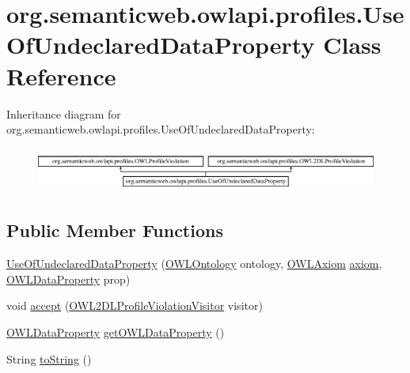 \hypertarget{classorg_1_1semanticweb_1_1owlapi_1_1profiles_1_1_use_of_undeclared_data_property}{\section{org.\-semanticweb.\-owlapi.\-profiles.\-Use\-Of\-Undeclared\-Data\-Property Class Reference}
\label{classorg_1_1semanticweb_1_1owlapi_1_1profiles_1_1_use_of_undeclared_data_property}
}
Inheritance diagram for org.\-semanticweb.\-owlapi.\-profiles.\-Use\-Of\-Undeclared\-Data\-Property\-:\begin{figure}[H]
\begin{center}
\leavevmode
\includegraphics[height=1.473684cm]{classorg_1_1semanticweb_1_1owlapi_1_1profiles_1_1_use_of_undeclared_data_property}
\end{center}
\end{figure}
\subsection*{Public Member Functions}
\begin{DoxyCompactItemize}
\item 
\hyperlink{classorg_1_1semanticweb_1_1owlapi_1_1profiles_1_1_use_of_undeclared_data_property_afd5864846b0d475e00cabb80a006a790}{Use\-Of\-Undeclared\-Data\-Property} (\hyperlink{interfaceorg_1_1semanticweb_1_1owlapi_1_1model_1_1_o_w_l_ontology}{O\-W\-L\-Ontology} ontology, \hyperlink{interfaceorg_1_1semanticweb_1_1owlapi_1_1model_1_1_o_w_l_axiom}{O\-W\-L\-Axiom} \hyperlink{classorg_1_1semanticweb_1_1owlapi_1_1profiles_1_1_o_w_l_profile_violation_aa7c8e8910ed3966f64a2c003fb516214}{axiom}, \hyperlink{interfaceorg_1_1semanticweb_1_1owlapi_1_1model_1_1_o_w_l_data_property}{O\-W\-L\-Data\-Property} prop)
\item 
void \hyperlink{classorg_1_1semanticweb_1_1owlapi_1_1profiles_1_1_use_of_undeclared_data_property_aaae2ae27312da4cbfc33da393dc05469}{accept} (\hyperlink{interfaceorg_1_1semanticweb_1_1owlapi_1_1profiles_1_1_o_w_l2_d_l_profile_violation_visitor}{O\-W\-L2\-D\-L\-Profile\-Violation\-Visitor} visitor)
\item 
\hyperlink{interfaceorg_1_1semanticweb_1_1owlapi_1_1model_1_1_o_w_l_data_property}{O\-W\-L\-Data\-Property} \hyperlink{classorg_1_1semanticweb_1_1owlapi_1_1profiles_1_1_use_of_undeclared_data_property_a772249be14de5d5c98f5394535a4391c}{get\-O\-W\-L\-Data\-Property} ()
\item 
String \hyperlink{classorg_1_1semanticweb_1_1owlapi_1_1profiles_1_1_use_of_undeclared_data_property_a6129fcfb6f74f6550f2157ee2b1a77b2}{to\-String} ()
\end{DoxyCompactItemize}
